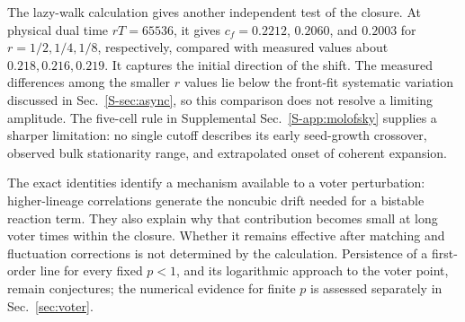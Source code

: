 The lazy-walk calculation gives another independent test of the closure.
At physical dual time $rT=65536$, it gives $c_f=0.2212$, $0.2060$, and
$0.2003$ for $r=1/2,1/4,1/8$, respectively, compared with measured values
about $0.218,0.216,0.219$. It captures the initial direction of the shift.
The measured differences among the smaller $r$ values lie below the
front-fit systematic variation discussed in Sec.~\ref{S-sec:async}, so this
comparison does not resolve a limiting amplitude. The five-cell rule in
Supplemental Sec.~\ref{S-app:molofsky} supplies a sharper limitation: no single cutoff describes its early seed-growth crossover, observed bulk
stationarity range, and extrapolated onset of coherent expansion.

The exact identities identify a mechanism available to a voter perturbation:
higher-lineage correlations generate the noncubic drift needed for a bistable
reaction term. They also explain why that contribution becomes small at long
voter times within the closure. Whether it remains effective after matching
and fluctuation corrections is not determined by the calculation. Persistence
of a first-order line for every fixed $p<1$, and its logarithmic approach to
the voter point, remain conjectures; the numerical evidence for finite $p$
is assessed separately in Sec.~\ref{sec:voter}.

